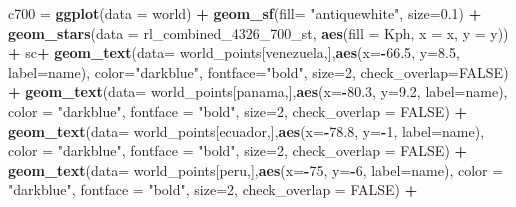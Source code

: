 \documentclass[12pt,twoside]{reedthesis}
\newenvironment{Shaded}{\begin{snugshade}}{\end{snugshade}}
\newcommand{\DataTypeTok}[1]{\textcolor[rgb]{0.13,0.29,0.53}{#1}}
\newcommand{\DecValTok}[1]{\textcolor[rgb]{0.00,0.00,0.81}{#1}}
\newcommand{\FloatTok}[1]{\textcolor[rgb]{0.00,0.00,0.81}{#1}}
\newcommand{\KeywordTok}[1]{\textcolor[rgb]{0.13,0.29,0.53}{\textbf{#1}}}
\newcommand{\NormalTok}[1]{#1}
\newcommand{\OperatorTok}[1]{\textcolor[rgb]{0.81,0.36,0.00}{\textbf{#1}}}
\newcommand{\OtherTok}[1]{\textcolor[rgb]{0.56,0.35,0.01}{#1}}
\newcommand{\StringTok}[1]{\textcolor[rgb]{0.31,0.60,0.02}{#1}}
\begin{document}
\begin{Shaded}
\begin{Highlighting}[]
\NormalTok{c700 =}\StringTok{ }\KeywordTok{ggplot}\NormalTok{(}\DataTypeTok{data =}\NormalTok{ world) }\OperatorTok{+}\StringTok{ }
\StringTok{  }\KeywordTok{geom_sf}\NormalTok{(}\DataTypeTok{fill=} \StringTok{"antiquewhite"}\NormalTok{, }\DataTypeTok{size=}\FloatTok{0.1}\NormalTok{) }\OperatorTok{+}\StringTok{ }
\StringTok{  }\KeywordTok{geom_stars}\NormalTok{(}\DataTypeTok{data =}\NormalTok{ rl_combined_}\DecValTok{4326}\NormalTok{_}\DecValTok{700}\NormalTok{_st, }\KeywordTok{aes}\NormalTok{(}\DataTypeTok{fill =}\NormalTok{ Kph, }\DataTypeTok{x =}\NormalTok{ x, }\DataTypeTok{y =}\NormalTok{ y)) }\OperatorTok{+}\StringTok{ }
\StringTok{  }\NormalTok{sc}\OperatorTok{+}
\StringTok{  }\KeywordTok{geom_text}\NormalTok{(}\DataTypeTok{data=}\NormalTok{ world_points[venezuela,],}\KeywordTok{aes}\NormalTok{(}\DataTypeTok{x=}\OperatorTok{-}\FloatTok{66.5}\NormalTok{, }\DataTypeTok{y=}\FloatTok{8.5}\NormalTok{, }\DataTypeTok{label=}\NormalTok{name), }\DataTypeTok{color=}\StringTok{"darkblue"}\NormalTok{, }\DataTypeTok{fontface=}\StringTok{"bold"}\NormalTok{, }\DataTypeTok{size=}\DecValTok{2}\NormalTok{, }\DataTypeTok{check_overlap=}\OtherTok{FALSE}\NormalTok{) }\OperatorTok{+}
\StringTok{  }\KeywordTok{geom_text}\NormalTok{(}\DataTypeTok{data=}\NormalTok{ world_points[panama,],}\KeywordTok{aes}\NormalTok{(}\DataTypeTok{x=}\OperatorTok{-}\FloatTok{80.3}\NormalTok{, }\DataTypeTok{y=}\FloatTok{9.2}\NormalTok{, }\DataTypeTok{label=}\NormalTok{name), }\DataTypeTok{color =} \StringTok{"darkblue"}\NormalTok{, }\DataTypeTok{fontface =} \StringTok{"bold"}\NormalTok{, }\DataTypeTok{size=}\DecValTok{2}\NormalTok{, }\DataTypeTok{check_overlap =} \OtherTok{FALSE}\NormalTok{) }\OperatorTok{+}\StringTok{ }
\StringTok{  }\KeywordTok{geom_text}\NormalTok{(}\DataTypeTok{data=}\NormalTok{ world_points[ecuador,],}\KeywordTok{aes}\NormalTok{(}\DataTypeTok{x=}\OperatorTok{-}\FloatTok{78.8}\NormalTok{, }\DataTypeTok{y=}\OperatorTok{-}\DecValTok{1}\NormalTok{, }\DataTypeTok{label=}\NormalTok{name), }\DataTypeTok{color =} \StringTok{"darkblue"}\NormalTok{, }\DataTypeTok{fontface =} \StringTok{"bold"}\NormalTok{, }\DataTypeTok{size=}\DecValTok{2}\NormalTok{, }\DataTypeTok{check_overlap =} \OtherTok{FALSE}\NormalTok{) }\OperatorTok{+}
\StringTok{  }\KeywordTok{geom_text}\NormalTok{(}\DataTypeTok{data=}\NormalTok{ world_points[peru,],}\KeywordTok{aes}\NormalTok{(}\DataTypeTok{x=}\OperatorTok{-}\DecValTok{75}\NormalTok{, }\DataTypeTok{y=}\OperatorTok{-}\DecValTok{6}\NormalTok{, }\DataTypeTok{label=}\NormalTok{name), }\DataTypeTok{color =} \StringTok{"darkblue"}\NormalTok{, }\DataTypeTok{fontface =} \StringTok{"bold"}\NormalTok{, }\DataTypeTok{size=}\DecValTok{2}\NormalTok{, }\DataTypeTok{check_overlap =} \OtherTok{FALSE}\NormalTok{) }\OperatorTok{+}

\end{Highlighting}
\end{Shaded}
\end{document}
